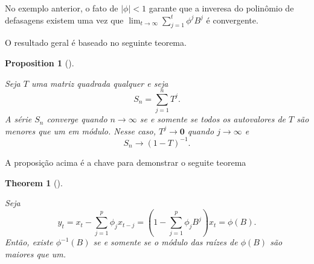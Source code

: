 \documentclass[
  letterpaper,
  DIV=11,
  numbers=noendperiod]{scrartcl}
\theoremstyle{definition}
\theoremstyle{definition}
\theoremstyle{plain}
\newtheorem{proposition}{Proposition}[chapter]
\theoremstyle{plain}
\newtheorem{theorem}{Theorem}[chapter]
\theoremstyle{remark}
\begin{document}
No exemplo anterior, o fato de \(|\phi|<1\) garante que a inveresa do
polinômio de defasagens existem uma vez que
\(\lim_{t\rightarrow\infty}\sum_{j=1}^t \phi^jB^j\) é convergente.

O resultado geral é baseado no seguinte teorema.

\begin{proposition}[]\protect\hypertarget{prp-pgMatrix}{}\label{prp-pgMatrix}

Seja \(T\) uma matriz quadrada qualquer e seja \[S_n=\sum_{j=1}^n T^j.\]
A série \(S_n\) converge quando \(n\rightarrow\infty\) se e somente se
todos os autovalores de \(T\) são menores que um em módulo. Nesse caso,
\(T^j\rightarrow \textbf{0}\) quando \(j\rightarrow\infty\) e
\[S_n\rightarrow (1-T)^{-1}.\]

\end{proposition}

A proposição acima é a chave para demonstrar o seguite teorema

\begin{theorem}[]\protect\hypertarget{thm-}{}\label{thm-}

Seja
\[y_t=x_t-\sum_{j=1}^p\phi_jx_{t-j}=\left(1-\sum_{j=1}^p\phi_jB^j\right)x_t=\phi(B).\]
Então, existe \(\phi^{-1}(B)\) se e somente se o módulo das raízes de
\(\phi(B)\) são maiores que um.

\end{theorem}
\end{document}
